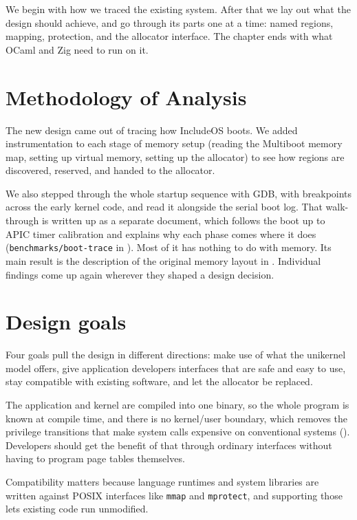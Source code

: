 \documentclass[12pt]{report}
\newcommand{\fullref}[1]{\Cref{#1}}
\renewcommand{\_}{\origunderscore\allowbreak}
\begin{document}
We begin with how we traced the existing system. After that we lay out what the design should achieve, and go through its parts one at a time: named regions, mapping, protection, and the allocator interface. The chapter ends with what OCaml and Zig need to run on it.

\section{Methodology of Analysis}
\label{sec:analysis-method}

The new design came out of tracing how IncludeOS boots. We added instrumentation to each stage of memory setup (reading the Multiboot memory map, setting up virtual memory, setting up the allocator) to see how regions are discovered, reserved, and handed to the allocator.

We also stepped through the whole startup sequence with GDB, with breakpoints across the early kernel code, and read it alongside the serial boot log. That walk-through is written up as a separate document, which follows the boot up to APIC timer calibration and explains why each phase comes where it does (\texttt{benchmarks/boot-trace} in \cite{thesis-benchmarks}). Most of it has nothing to do with memory. Its main result is the description of the original memory layout in \fullref{sec:includeos-memory-model}. Individual findings come up again wherever they shaped a design decision.

\section{Design goals}
\label{sec:design-goals}

Four goals pull the design in different directions: make use of what the unikernel model offers, give application developers interfaces that are safe and easy to use, stay compatible with existing software, and let the allocator be replaced.

The application and kernel are compiled into one binary, so the whole program is known at compile time, and there is no kernel/user boundary, which removes the privilege transitions that make system calls expensive on conventional systems (\fullref{sec:evaluation}). Developers should get the benefit of that through ordinary interfaces without having to program page tables themselves.

Compatibility matters because language runtimes and system libraries are written against POSIX interfaces like \texttt{mmap} and \texttt{mprotect}, and supporting those lets existing code run unmodified.
\end{document}
